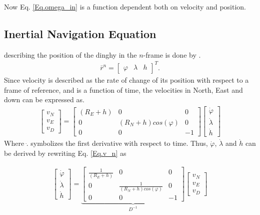 Now Eq. \eqref{Eq.omega_in} is a function dependent both on velocity and position.

\subsection{Inertial Navigation Equation}
describing the position of the dinghy in the $n$-frame is done by \cite{nonlinear}.
\begin{align}
\bar{r}^n=
\begin{bmatrix}
\varphi & \lambda & h
\end{bmatrix}^T.
\end{align}
Since velocity is described as the rate of change of its position with respect to a frame of reference, and is a function of time, the velocities in North, East and down can be expressed as.
\begin{align}
\begin{bmatrix}
v_N \\
v_E \\
v_D
\end{bmatrix}
=
\begin{bmatrix}
(R_E+h) & 0 & 0 \\
0 & (R_N+h)cos(\varphi) & 0\\
0 & 0 & -1
\end{bmatrix}
\begin{bmatrix}
\dot{\varphi}\\
\dot{\lambda}\\
\dot{h}
\end{bmatrix}
\label{Eq.v_n}
\end{align}
Where $\dot{.}$ symbolizes the first derivative with respect to time. Thus, $\dot{\varphi}$, $\dot{\lambda}$ and $\dot{h}$ can be derived by rewriting Eq. \eqref{Eq.v_n} as

\begin{align}
\begin{bmatrix}
\dot{\varphi}\\
\dot{\lambda}\\
\dot{h}
\end{bmatrix}
=
\underbrace{\begin{bmatrix}
\frac{1}{(R_E+h)} & 0 & 0 \\
0 & \frac{1}{(R_N+h)cos(\varphi)} & 0\\
0 & 0 & -1
\end{bmatrix}}_{D^{-1}}
\begin{bmatrix}
v_N \\
v_E \\
v_D
\end{bmatrix}
\label{Eq.v_n}
\end{align}

